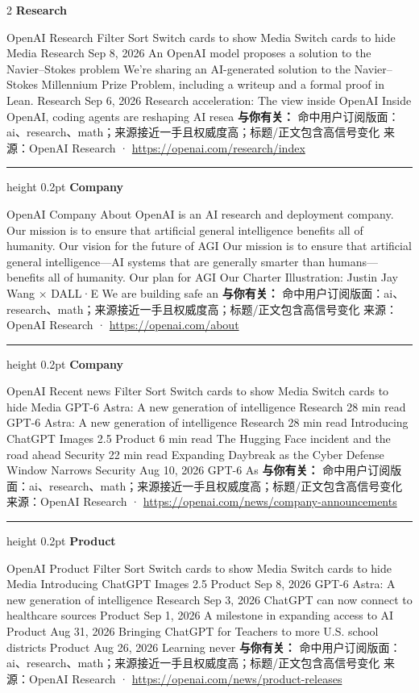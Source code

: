 \documentclass[10.5pt]{ctexart}
\begin{document}
\begin{multicols}{2}
{\large\bfseries Research}\par
OpenAI Research Filter Sort Switch cards to show Media Switch cards to hide Media Research Sep 8, 2026 An OpenAI model proposes a solution to the Navier–Stokes problem We’re sharing an AI-generated solution to the Navier–Stokes Millennium Prize Problem, including a writeup and a formal proof in Lean. Research Sep 6, 2026 Research acceleration: The view inside OpenAI Inside OpenAI, coding agents are reshaping AI resea
\textbf{与你有关：} 命中用户订阅版面：ai、research、math；来源接近一手且权威度高；标题/正文包含高信号变化
{\footnotesize\color{ormuted} 来源：OpenAI Research · \url{https://openai.com/research/index}}
\vspace{2mm}
\hrule height 0.2pt
\vspace{2mm}
{\large\bfseries Company}\par
OpenAI Company About OpenAI is an AI research and deployment company. Our mission is to ensure that artificial general intelligence benefits all of humanity. Our vision for the future of AGI Our mission is to ensure that artificial general intelligence—AI systems that are generally smarter than humans—benefits all of humanity. Our plan for AGI Our Charter Illustration: Justin Jay Wang × DALL·E We are building safe an
\textbf{与你有关：} 命中用户订阅版面：ai、research、math；来源接近一手且权威度高；标题/正文包含高信号变化
{\footnotesize\color{ormuted} 来源：OpenAI Research · \url{https://openai.com/about}}
\vspace{2mm}
\hrule height 0.2pt
\vspace{2mm}
{\large\bfseries Company}\par
OpenAI Recent news Filter Sort Switch cards to show Media Switch cards to hide Media GPT-6 Astra: A new generation of intelligence Research 28 min read GPT-6 Astra: A new generation of intelligence Research 28 min read Introducing ChatGPT Images 2.5 Product 6 min read The Hugging Face incident and the road ahead Security 22 min read Expanding Daybreak as the Cyber Defense Window Narrows Security Aug 10, 2026 GPT-6 As
\textbf{与你有关：} 命中用户订阅版面：ai、research、math；来源接近一手且权威度高；标题/正文包含高信号变化
{\footnotesize\color{ormuted} 来源：OpenAI Research · \url{https://openai.com/news/company-announcements}}
\vspace{2mm}
\hrule height 0.2pt
\vspace{2mm}
{\large\bfseries Product}\par
OpenAI Product Filter Sort Switch cards to show Media Switch cards to hide Media Introducing ChatGPT Images 2.5 Product Sep 8, 2026 GPT-6 Astra: A new generation of intelligence Research Sep 3, 2026 ChatGPT can now connect to healthcare sources Product Sep 1, 2026 A milestone in expanding access to AI Product Aug 31, 2026 Bringing ChatGPT for Teachers to more U.S. school districts Product Aug 26, 2026 Learning never 
\textbf{与你有关：} 命中用户订阅版面：ai、research、math；来源接近一手且权威度高；标题/正文包含高信号变化
{\footnotesize\color{ormuted} 来源：OpenAI Research · \url{https://openai.com/news/product-releases}}
\end{multicols}
\end{document}
